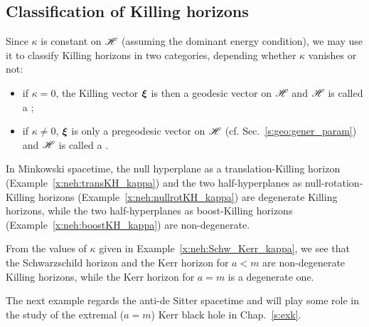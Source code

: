 \subsection{Classification of Killing horizons} \label{s:neh:classif_KH}

Since $\kappa$ is constant on $\mathscr{H}$ (assuming the dominant
energy condition), we may use it to classify Killing horizons in two
categories, depending whether $\kappa$ vanishes or not:
\begin{itemize}
\item if $\kappa = 0$, the Killing vector $\bm{\xi}$ is then a geodesic vector on $\mathscr{H}$
and $\mathscr{H}$ is called a ;
\item if $\kappa \not=0$, $\bm{\xi}$ is only a pregeodesic vector on $\mathscr{H}$
(cf. Sec.~\ref{s:geo:gener_param})
and $\mathscr{H}$ is called a .
\end{itemize}

\begin{example}
In Minkowski spacetime, the null hyperplane as a translation-Killing horizon
(Example~\ref{x:neh:transKH_kappa}) and the two half-hyperplanes as
null-rotation-Killing horizons (Example~\ref{x:neh:nullrotKH_kappa}) are
degenerate Killing horizons, while the two half-hyperplanes as
boost-Killing horizons (Example~\ref{x:neh:boostKH_kappa}) are non-degenerate.
\end{example}

\begin{example}
From the values of $\kappa$ given in Example~\ref{x:neh:Schw_Kerr_kappa},
we see that the Schwarzschild horizon and the Kerr horizon for
$a<m$ are non-degenerate Killing horizons, while the Kerr horizon for
$a=m$ is a degenerate one.
\end{example}

The next example regards the anti-de Sitter spacetime and will play some
role in the study of the extremal ($a=m$) Kerr black hole in Chap.~\ref{s:exk}.

